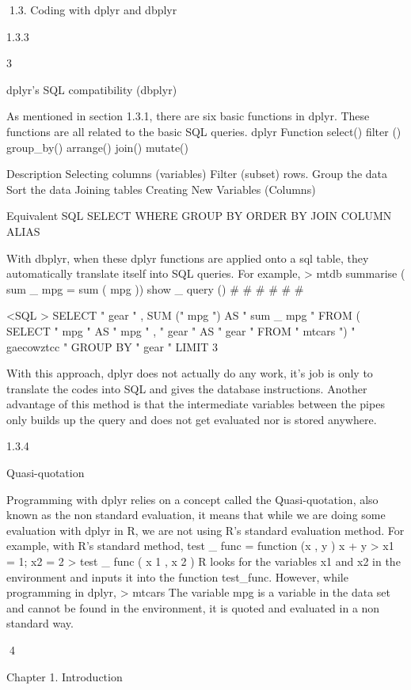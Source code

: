 1.3. Coding with dplyr and dbplyr

1.3.3

3

dplyr’s SQL compatibility (dbplyr)

As mentioned in section 1.3.1, there are six basic functions in dplyr. These functions
are all related to the basic SQL queries.
dplyr Function
select()
filter ()
group_by()
arrange()
join()
mutate()

Description
Selecting columns (variables)
Filter (subset) rows.
Group the data
Sort the data
Joining tables
Creating New Variables (Columns)

Equivalent SQL
SELECT
WHERE
GROUP BY
ORDER BY
JOIN
COLUMN ALIAS

With dbplyr, when these dplyr functions are applied onto a sql table, they automatically translate itself into SQL queries. For example,
> mtdb %
summarise ( sum _ mpg = sum ( mpg )) %
show _ query ()
#
#
#
#
#
#

<SQL >
SELECT " gear " , SUM (" mpg ") AS " sum _ mpg "
FROM ( SELECT " mpg " AS " mpg " , " gear " AS " gear "
FROM " mtcars ") " gaecowztcc "
GROUP BY " gear "
LIMIT 3

With this approach, dplyr does not actually do any work, it’s job is only to translate
the codes into SQL and gives the database instructions. Another advantage of this
method is that the intermediate variables between the pipes only builds up the query
and does not get evaluated nor is stored anywhere.

1.3.4

Quasi-quotation

Programming with dplyr relies on a concept called the Quasi-quotation, also known
as the non standard evaluation, it means that while we are doing some evaluation
with dplyr in R, we are not using R’s standard evaluation method. For example,
with R’s standard method,
test _ func = function (x , y ){
x + y
}
> x1 = 1; x2 = 2
> test _ func ( x 1 , x 2 )
R looks for the variables x1 and x2 in the environment and inputs it into the function
test_func.
However, while programming in dplyr,
> mtcars %
The variable mpg is a variable in the data set and cannot be found in the environment,
it is quoted and evaluated in a non standard way.

4

Chapter 1. Introduction

